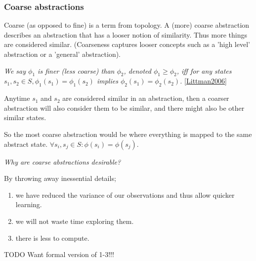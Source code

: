 
\subsubsection{Coarse abstractions}

Coarse (as opposed to fine) is a term from topology.
A (more) coarse abstraction describes an abstraction that has a looser notion of similarity.
Thus more things are considered similar.
(Coarseness captures looser concepts such as a 'high level' abstraction or a 'general' abstraction).

\textit{We say $\phi_1$ is finer (less coarse) than $\phi_2$, denoted $\phi_1 \ge \phi_2$,
iff for any states $s_1, s_2 \in S, \phi_1(s_1) = \phi_1(s_2)$ implies $\phi_2(s_1) = \phi_2(s_2)$.} \ref{Littman2006}

Anytime $s_1$ and $s_2$ are considered similar in an abstraction, then a coarser
abstraction will also consider them to be similar, and there might also be other similar states.

So the most coarse abstraction would be where everything is mapped to the same abstract state.
$\forall s_i, s_j\in S: \phi(s_i)=\phi(s_j)$.


\begin{displayquote}
\textit{Why are coarse abstractions desirable?}
\end{displayquote}

By throwing away inessential details;
\begin{enumerate}
  \tightlist
  \item we have reduced the variance of our observations and thus allow quicker learning.
  \item we will not waste time exploring them.
  \item there is less to compute.
\end{enumerate}



{\color{red}TODO Want formal version of 1-3!!!}


